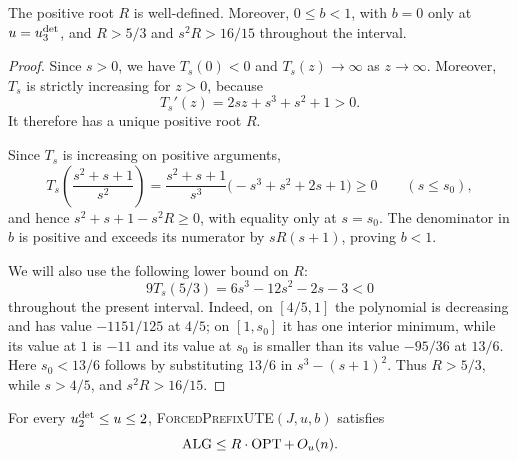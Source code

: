 \begin{claim}
\label{clm:opt:ute-admissibility}
The positive root $R$ is well-defined.  Moreover, $0\le b<1$, with $b=0$
only at $u=u_{3}^{\mathrm{det}}$, and $R>5/3$ and $s^2R>16/15$ throughout the interval.
\end{claim}

\begin{proof}
Since $s>0$, we have $T_s(0)<0$ and $T_s(z)\to\infty$ as
$z\to\infty$.  Moreover, $T_s$ is strictly increasing for $z>0$, because
\[
 T_s'(z)=2sz+s^3+s^2+1>0.
\]
It therefore has a unique positive root $R$.

Since $T_s$ is increasing on positive arguments,
\begin{equation}
 T_s\!\left(\frac{s^2+s+1}{s^2}\right)
 =\frac{s^2+s+1}{s^3}\bigl(-s^3+s^2+2s+1\bigr)\ge0
 \qquad(s\le s_0),
\end{equation}
and hence $s^2+s+1-s^2R\ge0$, with equality only at $s=s_0$.
The denominator in $b$ is positive and exceeds its numerator by
$sR(s+1)$, proving $b<1$.

We will also use the following lower bound on $R$:
\begin{equation}
 9T_s(5/3)=6s^3-12s^2-2s-3<0
 \label{eq:opt:T-five-thirds}
\end{equation}
throughout the present interval.  Indeed, on $[4/5,1]$ the polynomial is
decreasing and has value $-1151/125$ at $4/5$; on $[1,s_0]$ it has one
interior minimum, while its value at $1$ is $-11$ and its value at $s_0$
is smaller than its value $-95/36$ at $13/6$.  Here
$s_0<13/6$ follows by substituting $13/6$ in
$s^3-(s+1)^2$.  Thus $R>5/3$, while $s>4/5$, and
$s^2R>16/15$.
\end{proof}

\begin{claim}
\label{clm:opt:ute-low-range}
For every $u_{2}^{\mathrm{det}}\le u\le2$,
\textnormal{\textsc{ForcedPrefixUTE}}$(J,u,b)$ satisfies
\[
 \operatorname{ALG}\le R\cdot\operatorname{OPT}+\,O_u(n).
\]
\end{claim}

